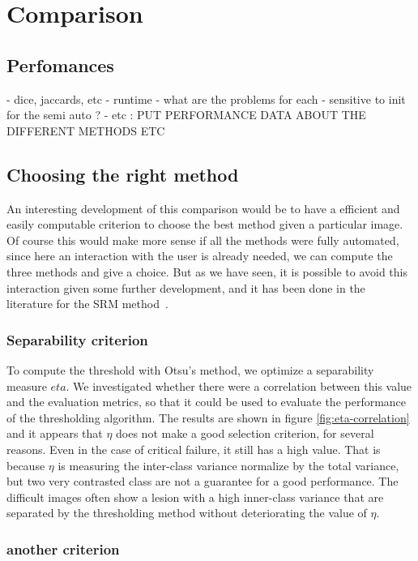 \documentclass[a4paper,10pt]{article}
\begin{document}
\section{Comparison}

\subsection{Perfomances}
- dice, jaccards, etc
- runtime
- what are the problems for each
- sensitive to init for the semi auto ?
- etc : PUT PERFORMANCE DATA ABOUT THE DIFFERENT METHODS
ETC

\subsection{Choosing the right method}
An interesting development of this comparison would be to have a efficient and easily computable criterion to choose the best method given a particular image. Of course this would make more sense if all the methods were fully automated, since here an interaction with the user is already needed, we can compute the three methods and give a choice. But as we have seen, it is possible to avoid this interaction given some further development, and it has been done in the literature for the SRM method~\cite{celebi_border_2008}. 

\subsubsection{Separability criterion}
To compute the threshold with Otsu's method, we optimize a separability measure $eta$. We investigated whether there were a correlation between this value and the evaluation metrics, so that it could be used to evaluate the performance of the thresholding algorithm. The results are shown in figure \ref{fig:eta-correlation} and it appears that $\eta$ does not make a good selection criterion, for several reasons. Even in the case of critical failure, it still has a high value. That is because $\eta$ is measuring the inter-class variance normalize by the total variance, but two very contrasted class are not a guarantee for a good performance. The difficult images often show a lesion with a high inner-class variance that are separated by the thresholding method without deteriorating the value of $\eta$.

\subsubsection{another criterion}
\end{document}
